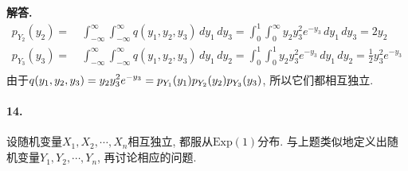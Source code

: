 \documentclass[12pt, a4paper, oneside]{ctexart}
\newenvironment{solution}{\par\noindent\textbf{解答. }}{\bigskip\par}
\begin{document}
\begin{solution}
\begin{equation*}
\begin{aligned}
            p_{Y_2}(y_2) =&\ \int_{-\infty}^{\infty}\int_{-\infty}^{\infty}q(y_1, y_2,y_3)\,dy_1\,dy_3 = \int_0^1\int_{0}^{\infty}y_2y_3^2e^{-y_3}\,dy_1\,dy_3 = 2y_2\\
            p_{Y_3}(y_3) =&\ \int_{-\infty}^{\infty}\int_{-\infty}^{\infty}q(y_1, y_2,y_3)\,dy_1\,dy_2 = \int_0^1\int_{0}^{1}y_2y_3^2e^{-y_3}\,dy_1\,dy_2 = \frac{1}{2}y_3^2e^{-y_3}\\
        \end{aligned}
    \end{equation*}
    由于$\displaystyle q(y_1,y_2,y_3) = y_2y_3^2e^{-y_3} = p_{Y_1}(y_1)p_{Y_2}(y_2)p_{Y_3}(y_3)$, 所以它们都相互独立.
\end{solution}
\paragraph{14.}设随机变量$X_1,X_2,\cdots,X_n$相互独立, 都服从$\text{Exp}(1)$分布. 与上题类似地定义出随机变量$Y_1,Y_2,\cdots,Y_n$, 再讨论相应的问题.
\end{document}

